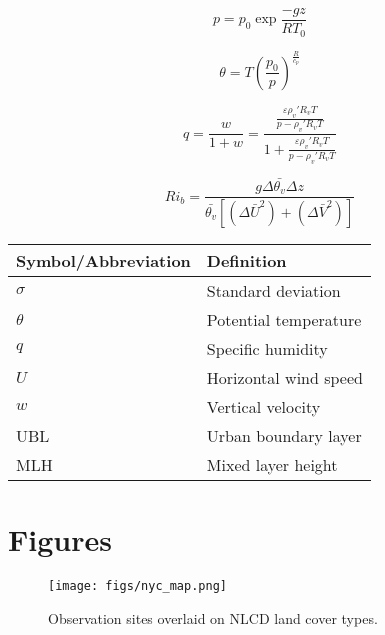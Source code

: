 \documentclass[11pt,a4paper]{article}
\begin{document}
\begin{equation*}\label{eqn:pressure}
	p = p_0 \exp{\frac{-g z}{R T_0}}
\end{equation*}

\begin{equation*}\label{eqn:potential_temperature}
	\theta = T \left(\frac{p_0}{p} \right)^{\frac{R}{c_p}}
\end{equation*}

\begin{equation*}\label{eqn:specific_humidity}
	q = \frac{w}{1+w} = \frac{\frac{\varepsilon \rho_v' R_v T}{p - \rho_v' R_v T}}{1+\frac{\varepsilon \rho_v' R_v T}{p - \rho_v' R_v T}} 
\end{equation*}

\begin{equation*}
	Ri_b = \frac{g \Delta \bar{\theta_v} \Delta z}{\bar{\theta_v} \left[ (\Delta \bar{U}^2) + (\Delta \bar{V}^2) \right] }
\end{equation*}

\label{tab:symbols}
\begin{center}
	\begin{tabularx}{0.5\textwidth}{l X}
 		\hline
 		Symbol/Abbreviation & Definition \\
 		\hline
 		$\sigma$ & Standard deviation \\
 		$\theta$ & Potential temperature \\
 		$q$ & Specific humidity \\
 		$U$ & Horizontal wind speed \\
 		$w$ & Vertical velocity \\
 		UBL & Urban boundary layer \\
 		MLH & Mixed layer height \\
 		\hline
	\end{tabularx}
\end{center}

\section*{Figures}

\begin{figure}[ht]
	\centering
	\texttt{[image: figs/nyc\_map.png]}
	\caption{Observation sites overlaid on NLCD land cover types.}
	\label{fig:nyc_map}
\end{figure}
\end{document}
